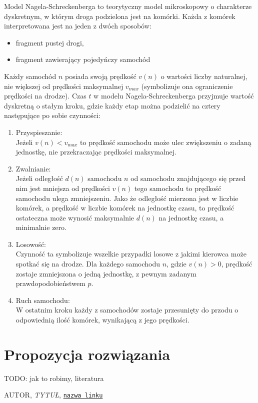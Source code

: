 \documentclass[a4paper,12pt]{article}
\begin{document}
	Model Nagela-Schreckenberga to teorytyczny model mikroskopowy o charakterze dyskretnym, w którym droga podzielona jest na komórki. Każda z komórek interpretowana jest na jeden z dwóch sposobów:
	\begin{itemize}
		\item fragment pustej drogi,
		\item fragment zawierający pojedyńczy samochód
	\end{itemize}
	Każdy samochód $n$ posiada swoją prędkość $v(n)$ o wartości liczby naturalnej, nie większej od prędkości maksymalnej $v_{max}$ (symbolizuje ona ograniczenie prędkości na drodze).
	Czas $t$ w modelu Nagela-Schreckenberga przyjmuje wartość dyskretną o stałym kroku, gdzie każdy etap można podzielić na cztery następujące po sobie czynności:
	\begin{enumerate}
		\item Przyspieszanie: \\
		Jeżeli $v(n) < v_{max}$ to prędkość samochodu może ulec zwiększeniu o zadaną jednostkę, nie przekraczając prędkości maksymalnej.
		\item Zwalnianie: \\
		Jeżeli odległość $d(n)$ samochodu $n$ od samochodu znajdującego się przed nim jest mniejsza od prędkości $v(n)$ tego samochodu to prędkość samochodu ulega zmniejszeniu. Jako że odległość mierzona jest w liczbie komórek, a prędkość w liczbie komórek na jednostkę czasu, to prędkość ostateczna może wynosić maksymalnie $d(n)$ na jednostkę czasu, a minimalnie zero.
		\item Losowość: \\
		Czynność ta symbolizuje wszelkie przypadki losowe z jakimi kierowca może spotkać się na drodze. Dla każdego samochodu $n$, gdzie $v(n) > 0$, prędkość zostaje zmniejszona o jedną jednostkę, z pewnym zadanym prawdopodobieństwem $p$.
		\item Ruch samochodu: \\
		W ostatnim kroku każdy z samochodów zostaje przesunięty do przodu o odpowiednią ilość komórek, wynikającą z jego prędkości.
	\end{enumerate}
	
	
	\section{Propozycja rozwiązania}
	TODO: jak to robimy, literatura
	
	\pagebreak
	\begin{thebibliography}{15}
		
		AUTOR, \textit{TYTUŁ},
		\texttt{\href{LINK}{nazwa linku}}
		
	\end{thebibliography}
	
\end{document}
